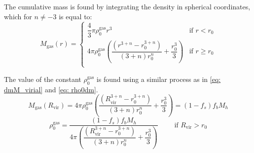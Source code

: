 			The cumulative mass is found by integrating the density in spherical coordinates, which for $n \neq -3$ is equal to:
			\begin{equation}
				M_\text{gas}(r) = \left \{
					\begin{matrix}
					\dfrac{4}{3}\pi\rho_0^\text{gas}r^3 & \text{if $r < r_0$} \\
					4\pi\rho_0^\text{gas}\left(\dfrac{\left(r^{3 + n} - r_0^{3 + n}\right)}{(3+n)r_0^{n}}  + \dfrac{r_0^3}{3}\right) & \text{if $r \geq r_0$} \\
					\end{matrix}
				\right.
			\end{equation}
			
			The value of the constant $\rho_0^\text{gas}$ is found using a similar process as in \autoref{eq: dmM_virial} and \ref{eq: rho0dm}.
			\begin{equation}
				M_\text{gas}(R_\text{vir}) = 4\pi\rho_0^\text{gas}\left(\dfrac{\left(R_\text{vir}^{3 + n} - r_0^{3 + n}\right)}{(3+n)r_0^{n}} + \dfrac{r_0^3}{3}\right) = (1 - f_s) f_bM_h
			\end{equation}
			\begin{equation}
				\rho_0^\text{gas} = \dfrac{(1 - f_s) f_bM_h}{4\pi \left(\dfrac{\left(R_\text{vir}^{3 + n} - r_0^{3 + n}\right)}{(3+n)r_0^{n}} + \dfrac{r_0^3}{3}\right)} \qquad \text{ if $R_\text{vir} > r_0$}
			\end{equation}
			
